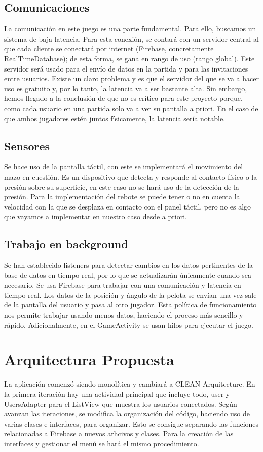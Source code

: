 \documentclass[a4paper,openright,12pt]{article}
\begin{document}
\subsection{Comunicaciones}
La comunicación en este juego es una parte fundamental. Para ello, buscamos un sistema de baja latencia. Para esta conexión, se contará con un servidor central al que cada cliente se conectará por internet (Firebase, concretamente RealTimeDatabase); de esta forma, se gana en rango de uso (rango global). Este servidor será usado para el envío de datos en la partida y para las invitaciones entre usuarios. Existe un claro problema y es que el servidor del que se va a hacer uso es gratuito y, por lo tanto, la latencia va a ser bastante alta. Sin embargo, hemos llegado a la conclusión de que no es crítico para este proyecto porque, como cada usuario en una partida solo va a ver su pantalla a priori. En el caso de que ambos jugadores estén juntos físicamente, la latencia sería notable.

\subsection{Sensores}
Se hace uso de la pantalla táctil, con este se implementará el movimiento del mazo en cuestión. Es un dispositivo que detecta y responde al contacto físico o la presión sobre su superficie, en este caso no se hará uso de la detección de la presión. Para la implementación del rebote se puede tener o no en cuenta la velocidad con la que se desplaza en contacto con el panel táctil, pero no es algo que vayamos a implementar en nuestro caso desde a priori.

\subsection{Trabajo en background}
Se han establecido listeners para detectar cambios en los datos pertinentes de la base de datos en tiempo real, por lo que se actualizarán únicamente cuando sea necesario. Se usa Firebase para trabajar con una comunicación y latencia en tiempo real. Los datos de la posición y ángulo de la pelota se envían una vez sale de la pantalla del usuario y pasa al otro jugador. Esta política de funcionamiento nos permite trabajar usando menos datos, haciendo el proceso más sencillo y rápido. Adicionalmente, en el GameActivity se usan hilos para ejecutar el juego.

\section{Arquitectura Propuesta}
La aplicación comenzó siendo monolítica y cambiará a CLEAN Arquitecture. En la primera iteración hay una actividad principal que incluye todo, user y UsersAdapter para el ListView que muestra los usuarios conectados. Según avanzan las iteraciones, se modifica la organización del código, haciendo uso de varias clases e interfaces, para organizar. Esto se consigue separando las funciones relacionadas a Firebase a nuevos arhcivos y clases. Para la creación de las interfaces y gestionar el menú se hará el mismo procedimiento.
\end{document}
